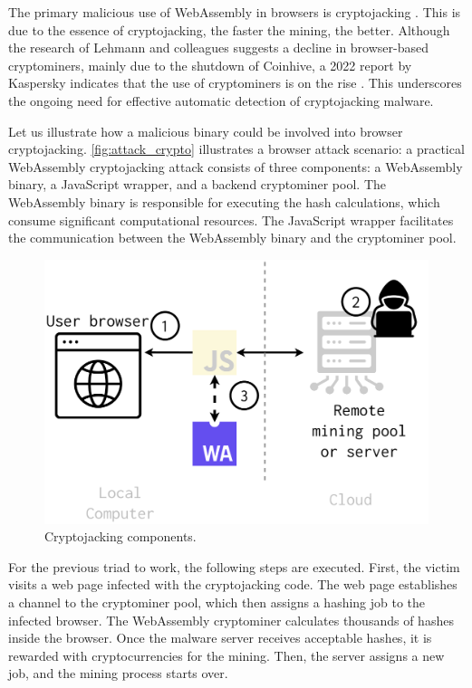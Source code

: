 \label{offensive_app}

The primary malicious use of WebAssembly in browsers is cryptojacking \cite{musch2019new}. 
This is due to the essence of cryptojacking, the faster the mining, the better. 
Although the research of Lehmann and colleagues \cite{Hilbig2021AnES} suggests a decline in browser-based cryptominers, mainly due to the shutdown of Coinhive, a 2022 report by Kaspersky indicates that the use of cryptominers is on the rise \cite{kasperksy}. 
This underscores the ongoing need for effective automatic detection of cryptojacking malware.


Let us illustrate how a malicious \wasm binary could be involved into browser cryptojacking.
\autoref{fig:attack_crypto} illustrates a browser attack scenario:
a practical WebAssembly cryptojacking attack consists of three components: a WebAssembly binary, a JavaScript wrapper, and a backend cryptominer pool. 
The WebAssembly binary is responsible for executing the hash calculations, which consume significant computational resources. 
The JavaScript wrapper facilitates the communication between the WebAssembly binary and the cryptominer pool.

\begin{figure}[h]
    \centering
    \includegraphics[width=0.6\linewidth]{figures/attack_crypto.pdf}
    \caption{Cryptojacking components.}
    \label{fig:attack_crypto}
\end{figure}

For the previous triad to work, the following steps are executed.
First, the victim visits a web page infected with the cryptojacking code. 
The web page establishes a channel to the cryptominer pool, which then assigns a hashing job to the infected browser. 
The WebAssembly cryptominer calculates thousands of hashes inside the browser. 
Once the malware server receives acceptable hashes, it is rewarded with cryptocurrencies for the mining. 
Then, the server assigns a new job, and the mining process starts over.

